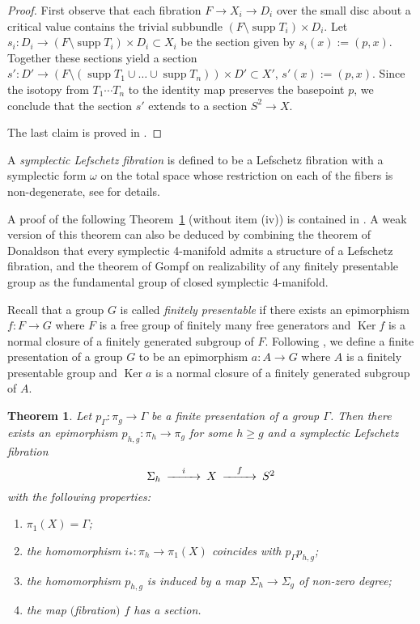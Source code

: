 \documentclass[12pt]{amsart}
\newtheorem{theorem}[subsection]{Theorem}%
\theoremstyle{definition}
\theoremstyle{remark}
\numberwithin{figure}{section}
\numberwithin{table}{section}
\numberwithin{equation}{section}
\def\m{\medskip}
\newcommand{\Ga}{{\Gamma}}
\newcommand{\Si}{{\Sigma}}
\newcommand\Ker{\operatorname{Ker}}
\newcommand\supp{\operatorname{supp}}
\newcommand\theoref{Theorem~\ref}
\begin{document}
\begin{proof}
First observe that each fibration 
$F\to X_i \to D_i$ over the small disc
about a critical value contains the trivial subbundle
$(F \setminus \supp T_i) \times D_i$. Let 
$s_i:D_i\to (F \setminus \supp T_i) \times D_i\subset X_i$ 
be the section given by $s_i(x):= (p,x)$.
Together these sections yield a section
$s':D'\to (F\setminus(\supp T_1 \cup \dots \cup \supp T_n ))\times D'\subset X'$,
$s'(x):=(p,x)$.
Since the isotopy from $T_1\cdots T_n$ to the identity map preserves
the basepoint $p$, we conclude that the section $s'$ extends to a section
$S^2\to X$.

The last claim is proved in \cite[Lemma 2.3]{ABKP}.
\end{proof}








\m A {\it symplectic Lefschetz fibration} is defined to be a Lefschetz fibration 
with a symplectic form $\omega$ on the total space whose restriction on each of the  
fibers is non-degenerate, see \cite{ABKP, GS} for details.

\m
A proof of the following \theoref{theor:amoros} (without item (iv)) is contained in 
\cite[Theorem A]{ABKP}. A weak version of this theorem can also be deduced by combining the theorem 
of Donaldson \cite{D1, ADK} that every symplectic 4-manifold admits a structure 
of a Lefschetz fibration, and the theorem of Gompf \cite{G1} on realizability of 
any finitely presentable group as the fundamental group of closed symplectic 
4-manifold.





\m Recall that a group $G$ is called {\em finitely presentable} if there exists an 
epimorphism $f:F \to G$ where $F$ is a free group of 
finitely many free generators and $\Ker f$ is a normal closure of a finitely
generated subgroup of $F$. Following \cite{ABKP}, we define a 
finite presentation of a group $G$ to be an epimorphism $a: A \to G$ where $A$ 
is a finitely presentable group and $\Ker a$ is a normal closure of a finitely
generated subgroup of $A$.

\begin{theorem}\label{theor:amoros}
Let $p_{\Ga}:\pi_g\to \Ga$ be a finite presentation of a group $\Ga$. Then there 
exists an 
epimorphism $p_{h,g}: \pi_h\to \pi_g$ for some $h\ge g$ and a symplectic 
Lefschetz fibration
$$
\CD
\Si_h @>i>> X @>f>> S^2
\endCD
$$
with the following properties:
\begin{enumerate}
\item[(i)]$\pi_1(X)=\Gamma$;
\item[(ii)] the homomorphism $i_*: \pi_h \to \pi_1(X)$ coincides with $p_{\Ga}p_{h,g}$;
\item[(iii)] the homomorphism $p_{h,g}$ is induced by a map $\Si_h\to \Si_g$ of non-zero degree;
\item[(iv)] the map $($fibration$)$ $f$ has a section.
\end{enumerate}
\end{theorem}
\end{document}
